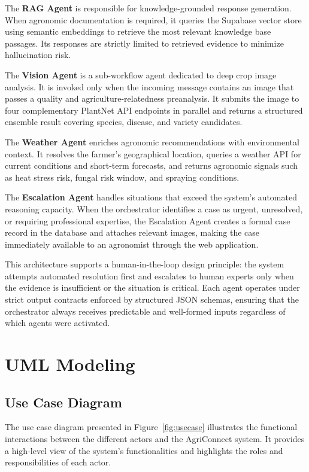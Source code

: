The \textbf{RAG Agent} is responsible for knowledge-grounded response generation. When agronomic documentation is required, it queries the Supabase vector store using semantic embeddings to retrieve the most relevant knowledge base passages. Its responses are strictly limited to retrieved evidence to minimize hallucination risk.

The \textbf{Vision Agent} is a sub-workflow agent dedicated to deep crop image analysis. It is invoked only when the incoming message contains an image that passes a quality and agriculture-relatedness preanalysis. It submits the image to four complementary PlantNet API endpoints in parallel and returns a structured ensemble result covering species, disease, and variety candidates.

The \textbf{Weather Agent} enriches agronomic recommendations with environmental context. It resolves the farmer's geographical location, queries a weather API for current conditions and short-term forecasts, and returns agronomic signals such as heat stress risk, fungal risk window, and spraying conditions.

The \textbf{Escalation Agent} handles situations that exceed the system's automated reasoning capacity. When the orchestrator identifies a case as urgent, unresolved, or requiring professional expertise, the Escalation Agent creates a formal case record in the database and attaches relevant images, making the case immediately available to an agronomist through the web application.

This architecture supports a human-in-the-loop design principle: the system attempts automated resolution first and escalates to human experts only when the evidence is insufficient or the situation is critical. Each agent operates under strict output contracts enforced by structured JSON schemas, ensuring that the orchestrator always receives predictable and well-formed inputs regardless of which agents were activated.

\section{UML Modeling}
\subsection{Use Case Diagram}

The use case diagram presented in Figure~\ref{fig:usecase} illustrates the functional interactions between the different actors and the AgriConnect system. It provides a high-level view of the system’s functionalities and highlights the roles and responsibilities of each actor.

